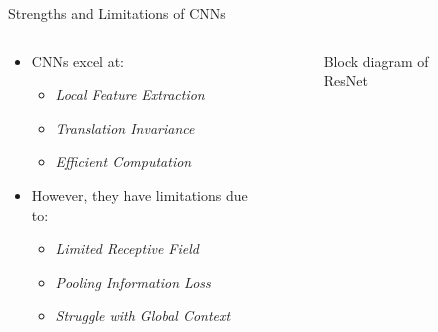 \begin{frame}{Strengths and Limitations of CNNs}
    \begin{columns}
        \begin{column}{0.55\linewidth}
            \begin{itemize}
                \item CNNs excel at:
                \begin{itemize}
                    \item \emph{Local Feature Extraction} 
                    \item \emph{Translation Invariance} 
                    \item \emph{Efficient Computation} 
                \end{itemize}
                \item However, they have limitations due to:
                \begin{itemize}
                    \item \emph{Limited Receptive Field} 
                    \item \emph{Pooling Information Loss} 
                    \item \emph{Struggle with Global Context} 
                \end{itemize}
            \end{itemize}
        \end{column}
        \begin{column}{0.45\linewidth}
            \begin{figure}
                \centering
                
                \caption{Block diagram of ResNet}
                \label{fig:resnet}
            \end{figure}
        \end{column}
    \end{columns}
\end{frame}





